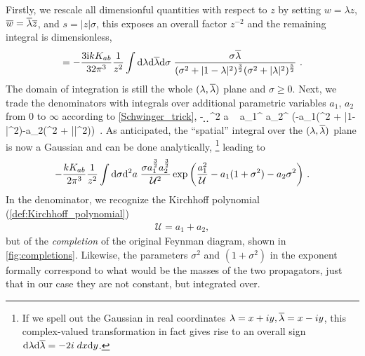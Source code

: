 \documentclass[11pt]{amsart}
\numberwithin{equation}{section}
\numberwithin{figure}{section}
\numberwithin{table}{section}
\begin{document}
Firstly, we rescale all dimensionful quantities with respect to $z$ by setting $w = \lambda z$, ${\overline{w}} = \overline{\lambda}{\overline{z}}$, and $s = |z| \sigma$, this exposes an overall factor $z^{-2}$ and the remaining integral is dimensionless,
\begin{align}
	= -\frac{3\text{i} k K_{ab}}{32 \pi^3} \frac{1}{z^2} \int \mathrm{d} \lambda \mathrm{d} \overline{\lambda} \mathrm{d} \sigma\; \frac{\sigma \overline{\lambda}}{(\sigma^2 + |1-\lambda|^2)^{\scriptstyle{\frac{3}{2}}}(\sigma^2+|\lambda|^2)^{\scriptstyle{\frac{5}{2}}}}~.
\end{align} 
The domain of integration is still the whole $(\lambda, \overline{\lambda})$ plane and  $\sigma \geq 0$.
Next, we trade the denominators with integrals over additional parametric variables $a_1$, $a_2$ from $0$ to $\infty$ according to \cref{Schwinger_trick},
\be
	-  \int \d \lambda \d \ol{\lambda} \d \sigma \d^2 a ~\sigma \ol{\lambda} a_1^{} a_2^{} \exp\bigg(-a_1(\sigma^2 + |1-\lambda|^2)-a_2(\sigma^2 + |\lambda|^2)\bigg)~.
\ee
As anticipated, the \enquote{spatial} integral over the $(\lambda, \overline{\lambda})$ plane is now a Gaussian and can be done analytically,%
%
\footnote{If we spell out the Gaussian in real coordinates $\lambda=x+iy, \overline{\lambda}=x-iy$, this complex-valued transformation in fact gives rise to an overall sign   $\mathrm{d} \lambda \mathrm{d} \overline{\lambda} = -2 i \;d x \mathrm{d} y$.} %
%
leading to
\begin{align}\label{A1_schwinger1}
	-\frac{k K_{ab}}{2 \pi^3} \frac{1}{z^2} \int \mathrm{d} \sigma \mathrm{d}^2 a \; \frac{\sigma a_1^{\scriptstyle{\frac{3}{2}}} a_2^{\scriptstyle{\frac{3}{2}}}}{\mathcal U^2} \exp\bigg(\frac{a_1^2}{\mathcal U}-a_1 (1+\sigma^2)-a_2\sigma^2\bigg)~.
\end{align}
In the denominator, we recognize the Kirchhoff polynomial (\cref{def:Kirchhoff_polynomial})
\begin{align}\label{A1_integral1_U}
	\mathcal U = a_1 +a_2,
\end{align} 
but of the \emph{completion} of the original Feynman diagram, shown in \cref{fig:completions}.
Likewise, the parameters $\sigma^2$ and $(1+\sigma^2)$ in the exponent formally correspond to what would be the masses of the two propagators, just that in our case they are not constant, but integrated over. 
\end{document}
